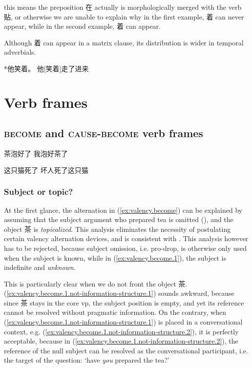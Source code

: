\documentclass[UTF8, a4paper, oneside, scheme=plain, 12pt]{ctexrep}
\newcommand{\translate}[1]{`#1'}
\newcommand*{\category}[1]{\textsc{#1}}
\begin{document}
this means the preposition 在 actually is morphologically merged with the verb 贴, 
or otherwise we are unable to explain why 
in the first example, 着 can never appear, 
while in the second example, 着 can appear.

Although 着 can appear in a matrix clause, 
its distribution is wider in temporal adverbials. 

*他笑着。
他[笑着]走了进来

\chapter{Verb frames}\label{chap:verb-frames}

\section{\category{become} and \category{cause}-\category{become} verb frames}

\begin{exe}
    \ex\label{ex:valency.become} \begin{xlist}
        \ex\label{ex:valency.become.1} 茶泡好了
        \ex 我泡好茶了
    \end{xlist}

    \ex\label{ex:valency.become-only}
    \begin{xlist}
        \ex\label{ex:valency.become-only.1} 这只猫死了
        \ex *坏人死了这只猫
    \end{xlist}
\end{exe}

\subsection{Subject or topic?}\label{sec:valency.become.subject-or-topic}

At the first glance, the alternation in (\ref{ex:valency.become})
can be explained by assuming that the 
subject argument who prepared tea is omitted (),
and the object 茶 is \emph{topicalized}.
This analysis eliminates the necessity of postulating certain valency alternation devices,
and is consistent with \citet{lapolla20091}.
This analysis however has to be rejected,
because subject omission, i.e. pro-drop,
is otherwise only used when the subject is known,
while in (\ref{ex:valency.become.1}),
the subject is indefinite and \emph{unknown}.

This is particularly clear when we do not front the object 茶.
(\ref{ex:valency.become.1.not-information-structure.1}) sounds awkward,
because since 茶 stays in the core \ac{vp},
the subject position is empty, and yet its reference cannot be resolved
without pragmatic information.
On the contrary, when (\ref{ex:valency.become.1.not-information-structure.1})
is placed in a conversational context,
e.g. (\ref{ex:valency.become.1.not-information-structure.2}),
it is perfectly acceptable, because in (\ref{ex:valency.become.1.not-information-structure.2}),
the reference of the null subject can be resolved as the conversational participant,
i.e. the target of the question:
\translate{have \emph{you} prepared the tea?}
\end{document}
